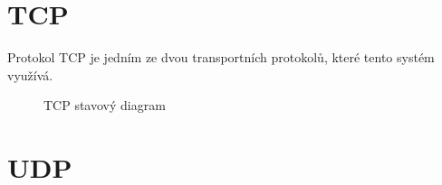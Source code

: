 \section{TCP}
Protokol TCP je jedním ze dvou transportních protokolů, které tento systém využívá.
\begin{figure}[h]
    \centering
	\caption{TCP stavový diagram} %
\end{figure}

\section{UDP}